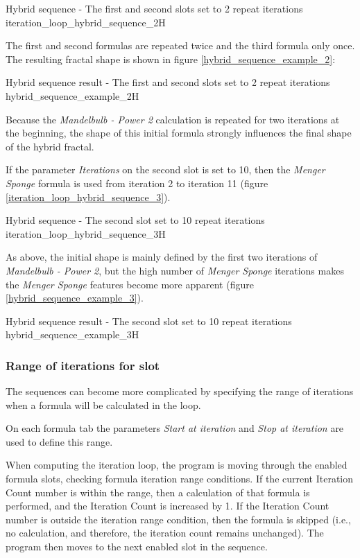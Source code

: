 {Hybrid sequence - The first and second slots set to 2 repeat iterations}
{iteration_loop_hybrid_sequence_2}{H}

The first and second formulas are repeated twice and the third formula only once.
The resulting fractal shape is shown in figure \ref{hybrid_sequence_example_2}:

{Hybrid sequence result - The first and second slots set to 2 repeat iterations}
{hybrid_sequence_example_2}{H}

Because the \emph{Mandelbulb - Power 2} calculation is repeated for two iterations at the beginning, the shape of this initial formula strongly influences the final shape of the hybrid fractal.

If the parameter \emph{Iterations} on the second slot is set to 10,
then the \emph{Menger Sponge} formula is used from iteration 2 to iteration 11 (figure \ref{iteration_loop_hybrid_sequence_3}).

{Hybrid sequence - The second slot set to 10 repeat iterations}
{iteration_loop_hybrid_sequence_3}{H}

As above, the initial shape is mainly defined by the first two iterations of \emph{Mandelbulb - Power 2},
but the high number of \emph{Menger Sponge} iterations makes the \emph{Menger Sponge} features become more apparent (figure \ref{hybrid_sequence_example_3}).

{Hybrid sequence result - The second slot set to 10 repeat iterations}
{hybrid_sequence_example_3}{H}

\subsubsection{Range of iterations for slot}

The sequences can become more complicated by specifying the range of iterations when a formula will be calculated in the loop.

On each formula tab the parameters \emph{Start at iteration} and \emph{Stop at iteration} are used to define this range.

When computing the iteration loop, the program is moving through the enabled formula slots, checking formula iteration range conditions. If the current Iteration Count number is within the range, then a calculation of that formula is performed, and the Iteration Count is increased by 1. If the Iteration Count number is outside the iteration range condition, then the formula is skipped (i.e., no calculation, and therefore, the iteration count remains unchanged). The program then moves to the next enabled slot in the sequence.

